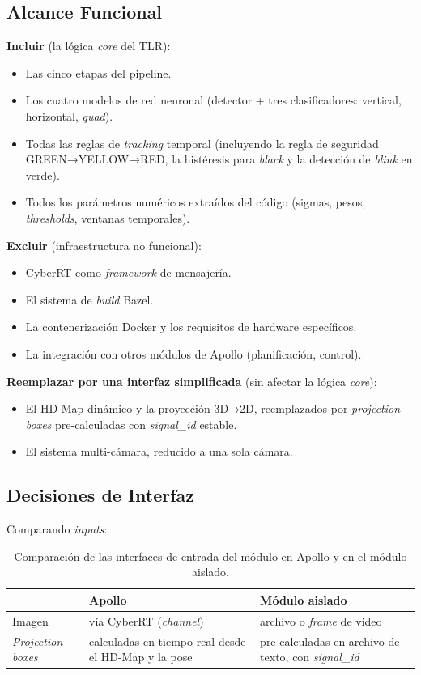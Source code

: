 \subsection{Alcance Funcional}

\textbf{Incluir} (la lógica \textit{core} del TLR):
\begin{itemize}
    \item Las cinco etapas del pipeline.
    \item Los cuatro modelos de red neuronal (detector + tres clasificadores: vertical, horizontal, \textit{quad}).
    \item Todas las reglas de \textit{tracking} temporal (incluyendo la regla de seguridad GREEN→YELLOW→RED, la histéresis para \textit{black} y la detección de \textit{blink} en verde).
    \item Todos los parámetros numéricos extraídos del código (sigmas, pesos, \textit{thresholds}, ventanas temporales).
\end{itemize}

\textbf{Excluir} (infraestructura no funcional):
\begin{itemize}
    \item CyberRT como \textit{framework} de mensajería.
    \item El sistema de \textit{build} Bazel.
    \item La contenerización Docker y los requisitos de hardware específicos.
    \item La integración con otros módulos de Apollo (planificación, control).
\end{itemize}

\textbf{Reemplazar por una interfaz simplificada} (sin afectar la lógica \textit{core}):
\begin{itemize}
    \item El HD-Map dinámico y la proyección 3D→2D, reemplazados por \textit{projection boxes} pre-calculadas con \textit{signal\_id} estable.
    \item El sistema multi-cámara, reducido a una sola cámara.
\end{itemize}

\subsection{Decisiones de Interfaz}

Comparando \textit{inputs}:

\begin{table}[H]
\centering
\begin{tabular}{|l|p{5cm}|p{5cm}|}
\hline
& \textbf{Apollo} & \textbf{Módulo aislado} \\
\hline
Imagen & vía CyberRT (\textit{channel}) & archivo o \textit{frame} de video \\
\hline
\textit{Projection boxes} & calculadas en tiempo real desde el HD-Map y la pose & pre-calculadas en archivo de texto, con \textit{signal\_id} \\
\hline
\end{tabular}
\caption{Comparación de las interfaces de entrada del módulo en Apollo y en el módulo aislado.}
\end{table}

